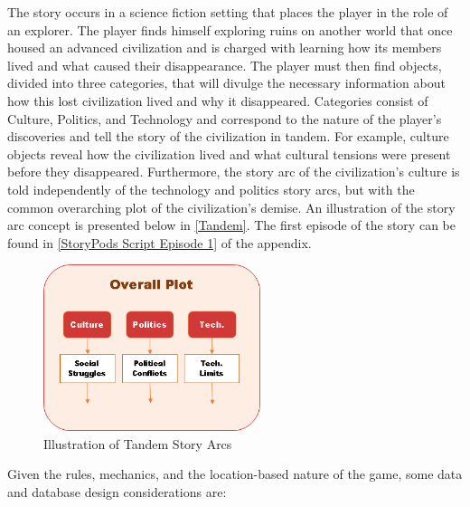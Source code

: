 \documentclass[conference]{IEEEtran}
\begin{document}
The story occurs in a science fiction setting that places the player in the role of an explorer. The player finds himself exploring ruins on another world that once housed an advanced civilization and is charged with learning how its members lived and what caused their disappearance. The player must then find objects, divided into three categories, that will divulge the necessary information about how this lost civilization lived and why it disappeared. Categories consist of Culture, Politics, and Technology and correspond to the nature of the player’s discoveries and tell the story of the civilization in tandem. For example, culture objects reveal how the civilization lived and what cultural tensions were present before they disappeared. Furthermore, the story arc of the civilization’s culture is told independently of the technology and politics story arcs, but with the common overarching plot of the civilization’s demise. An illustration of the story arc concept is presented below in \autoref{Tandem}. The first episode of the story can be found in \autoref{StoryPods Script Episode 1} of the appendix.

\begin{figure}[h]
\centering
\includegraphics[width=2.5in]{imgs/TandemPlot2.png}
\caption{Illustration of Tandem Story Arcs}
\label{Tandem}
\end{figure}

Given the rules, mechanics, and the location-based nature of the game, some data and database design considerations are:
\end{document}
